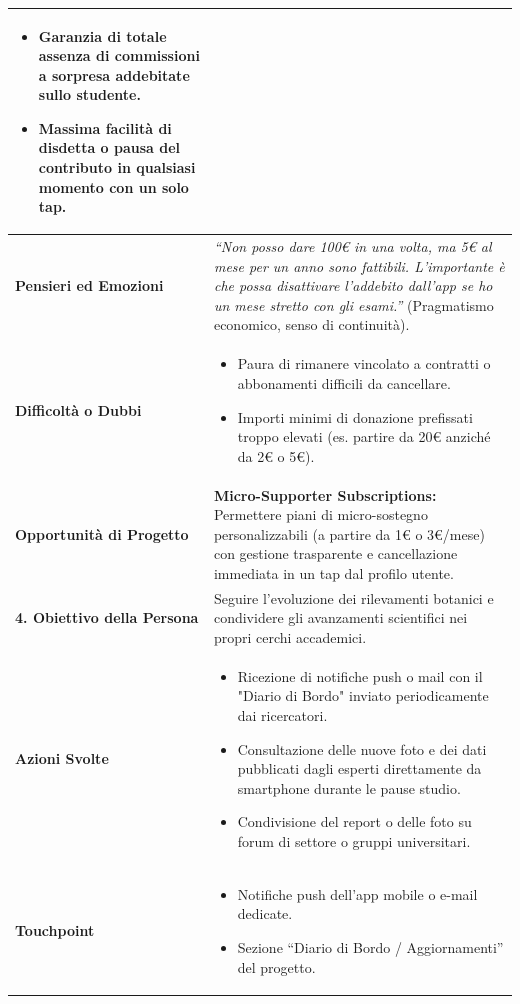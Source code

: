 \documentclass[11pt,a4paper]{article}
\begin{document}
\begin{table}[h!]
\begin{tabular}{|p{3.2cm}|p{11.8cm}|}
\begin{itemize}[leftmargin=*,nosep]
    \item Garanzia di totale assenza di commissioni a sorpresa addebitate sullo studente.
    \item Massima facilità di disdetta o pausa del contributo in qualsiasi momento con un solo tap.
\end{itemize} \\ \hline
\textbf{Pensieri ed Emozioni} &
\textit{``Non posso dare 100€ in una volta, ma 5€ al mese per un anno sono fattibili. L'importante è che possa disattivare l'addebito dall'app se ho un mese stretto con gli esami.''} (Pragmatismo economico, senso di continuità). \\ \hline
\textbf{Difficoltà o Dubbi} &
\begin{itemize}[leftmargin=*,nosep]
    \item Paura di rimanere vincolato a contratti o abbonamenti difficili da cancellare.
    \item Importi minimi di donazione prefissati troppo elevati (es. partire da 20€ anziché da 2€ o 5€).
\end{itemize} \\ \hline
\textbf{Opportunità di Progetto} &
\textbf{Micro-Supporter Subscriptions:} Permettere piani di micro-sostegno personalizzabili (a partire da 1€ o 3€/mese) con gestione trasparente e cancellazione immediata in un tap dal profilo utente. \\ \hline
\hline
\textbf{4. Obiettivo della Persona} & Seguire l'evoluzione dei rilevamenti botanici e condividere gli avanzamenti scientifici nei propri cerchi accademici. \\ \hline
\textbf{Azioni Svolte} &
\begin{itemize}[leftmargin=*,nosep]
    \item Ricezione di notifiche push o mail con il "Diario di Bordo" inviato periodicamente dai ricercatori.
    \item Consultazione delle nuove foto e dei dati pubblicati dagli esperti direttamente da smartphone durante le pause studio.
    \item Condivisione del report o delle foto su forum di settore o gruppi universitari.
\end{itemize} \\ \hline
\textbf{Touchpoint} &
\begin{itemize}[leftmargin=*,nosep]
    \item Notifiche push dell'app mobile o e-mail dedicate.
    \item Sezione ``Diario di Bordo / Aggiornamenti'' del progetto.

\end{itemize}
\end{tabular}
\end{table}
\end{document}

